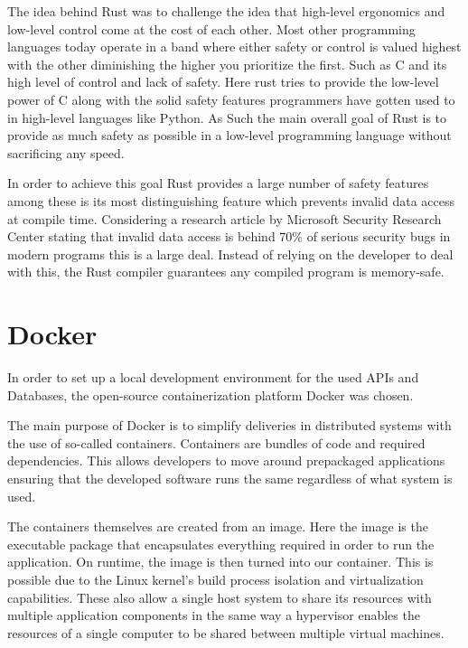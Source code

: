 The idea behind Rust was to challenge the idea that high-level ergonomics and low-level control come at the cost of each other\cite{Rust_Book}.
Most other programming languages today operate in a band where either safety or control is valued highest with the other diminishing the higher you prioritize the first. Such as C and its high level of control and lack of safety. 
Here rust tries to provide the low-level power of C along with the solid safety features programmers have gotten used to in high-level languages like Python. 
As Such the main overall goal of Rust is to provide as much safety as possible in a low-level programming language without sacrificing any speed\cite{Rust_in_Action}.

In order to achieve this goal Rust provides a large number of safety features among these is its most distinguishing feature which prevents invalid data access at compile time. 
Considering a research article by Microsoft Security Research Center stating that invalid data access is behind 70\% of serious security bugs in modern programs this is a large deal\cite{Safe_Systems_Languages}. 
Instead of relying on the developer to deal with this, the Rust compiler guarantees any compiled program is memory-safe.


\section{Docker}
In order to set up a local development environment for the used APIs and Databases, the open-source containerization platform Docker was chosen. 

The main purpose of Docker is to simplify deliveries in distributed systems with the use of so-called containers\cite{Docker_Container}.
Containers are bundles of code and required dependencies. This allows developers to move around prepackaged applications ensuring that the developed software runs the same regardless of what system is used\cite{Docker_Container}.

The containers themselves are created from an image. Here the image is the executable package that encapsulates everything required in order to run the application. On runtime, the image is then turned into our container. 
This is possible due to the Linux kernel's build process isolation and virtualization capabilities. These also allow a single host system to share its resources with multiple application components in the same way a hypervisor enables the resources of a single computer to be shared between multiple virtual machines\cite{Docker_Container}.

